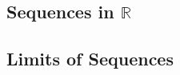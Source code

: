 \documentclass[8pt,landscape]{article}
\begin{document}
\begin{multicols}{3}

    \section{Sequences in $\mathbb{R}$}

    \subsection{Limits of Sequences}







\end{multicols}
\end{document}
